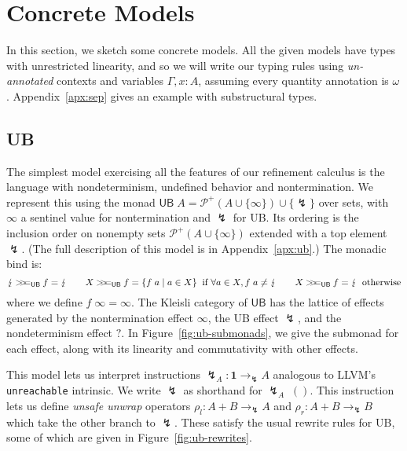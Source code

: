 \documentclass[acmsmall,screen,review]{acmart}
\newcommand{\mc}[1]{\ensuremath{\mathcal{#1}}}
\newcommand{\mb}[1]{\ensuremath{\mathbf{#1}}}
\newcommand{\ms}[1]{\ensuremath{\mathsf{#1}}}
\newcommand{\topq}{\omega}
\newcommand{\ubeff}{\lightning}
\newcommand{\obind}{\mathbin{>\!\!>\mkern-6.7mu=}}
\newcommand{\mbind}[3]{#2 \obind_{#1} #3}
\begin{document}
\section{Concrete Models}

In this section, we sketch some concrete models. All the given models have
types with unrestricted linearity, and so we will write our typing rules using
\emph{un-annotated} contexts and variables $\Gamma, x: A$, assuming every quantity annotation is $\topq$. Appendix~\ref{apx:sep} gives an example with substructural types.

\subsection{UB}

The simplest model exercising all the features of our refinement calculus is the language with
nondeterminism, undefined behavior and nontermination. We represent this using the monad $\ms{UB}\;A
= \mc{P}^+(A \cup \{\infty\}) \cup \{\ubeff\}$ over sets, with $\infty$ a sentinel value for
nontermination and $\ubeff$ for UB. Its ordering is the inclusion order on nonempty sets $\mc{P}^+(A
\cup \{\infty\})$ extended with a top element $\ubeff$. (The full description of this model is in
Appendix~\ref{apx:ub}.) The monadic bind is:
$$
\mbind{\ms{UB}}{\ubeff}{f} = \ubeff \qquad
\mbind{\ms{UB}}{X}{f} = \{f\;a \mid a \in X\} \;\; \text{if } \forall a \in X, f\;a \neq \ubeff
\qquad
\mbind{\ms{UB}}{X}{f} = \ubeff \;\; \text{otherwise}
$$
where we define $f\;\infty = \infty$. 
%
The Kleisli category of $\ms{UB}$ has the lattice of effects generated by the nontermination effect
$\infty$, the UB effect $\ubeff$, and the nondeterminism effect $?$. In
Figure~\ref{fig:ub-submonads}, we give the submonad for each effect, along with its linearity and
commutativity with other effects.

This model lets us interpret instructions $\ubeff_A: \mb{1} \to_\ubeff A$ analogous to LLVM's
\texttt{unreachable} intrinsic. We write $\ubeff$ as shorthand for 
$\ubeff_A\;()$. This instruction lets us define \emph{unsafe unwrap} operators
$\rho_l : A + B \to_\ubeff A$ and $\rho_r : A + B \to_\ubeff B$
which take the other branch to $\ubeff$.
%
These satisfy the usual rewrite rules for UB, some of which are given in 
Figure~\ref{fig:ub-rewrites}.
\end{document}
